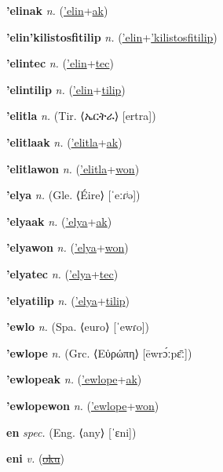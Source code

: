 \textbf{\hypertarget{'elinak}{'elinak}} \textit{n.} (\hyperlink{'elin}{'elin}+\allowbreak \hyperlink{ak}{ak})


\textbf{\hypertarget{'elin'kilistosfitilip}{'elin'kilistosfitilip}} \textit{n.} (\hyperlink{'elin}{'elin}+\allowbreak \hyperlink{'kilistosfitilip}{'kilistosfitilip})


\textbf{\hypertarget{'elintec}{'elintec}} \textit{n.} (\hyperlink{'elin}{'elin}+\allowbreak \hyperlink{tec}{tec})


\textbf{\hypertarget{'elintilip}{'elintilip}} \textit{n.} (\hyperlink{'elin}{'elin}+\allowbreak \hyperlink{tilip}{tilip})


\textbf{\hypertarget{'elitla}{'elitla}} \textit{n.} (Tir. ⟨{\ethiopic{}ኤርትራ}⟩ [ertra])


\textbf{\hypertarget{'elitlaak}{'elitlaak}} \textit{n.} (\hyperlink{'elitla}{'elitla}+\allowbreak \hyperlink{ak}{ak})


\textbf{\hypertarget{'elitlawon}{'elitlawon}} \textit{n.} (\hyperlink{'elitla}{'elitla}+\allowbreak \hyperlink{won}{won})


\textbf{\hypertarget{'elya}{'elya}} \textit{n.} (Gle. ⟨Éire⟩ [ˈeːɾʲə])


\textbf{\hypertarget{'elyaak}{'elyaak}} \textit{n.} (\hyperlink{'elya}{'elya}+\allowbreak \hyperlink{ak}{ak})


\textbf{\hypertarget{'elyawon}{'elyawon}} \textit{n.} (\hyperlink{'elya}{'elya}+\allowbreak \hyperlink{won}{won})


\textbf{\hypertarget{'elyatec}{'elyatec}} \textit{n.} (\hyperlink{'elya}{'elya}+\allowbreak \hyperlink{tec}{tec})


\textbf{\hypertarget{'elyatilip}{'elyatilip}} \textit{n.} (\hyperlink{'elya}{'elya}+\allowbreak \hyperlink{tilip}{tilip})


\textbf{\hypertarget{'ewlo}{'ewlo}} \textit{n.} (Spa. ⟨euro⟩ [ˈewɾo])


\textbf{\hypertarget{'ewlope}{'ewlope}} \textit{n.} (Grc. ⟨Εὐρώπη⟩ [ēwrɔ́ːpɛ̄ː])


\textbf{\hypertarget{'ewlopeak}{'ewlopeak}} \textit{n.} (\hyperlink{'ewlope}{'ewlope}+\allowbreak \hyperlink{ak}{ak})


\textbf{\hypertarget{'ewlopewon}{'ewlopewon}} \textit{n.} (\hyperlink{'ewlope}{'ewlope}+\allowbreak \hyperlink{won}{won})


\textbf{\hypertarget{en}{en}} \textit{spec.} (Eng. ⟨any⟩ [ˈɛni])


\textbf{\hypertarget{eni}{eni}} \textit{v.} (\hyperlink{oku}{\sout{oku}})


